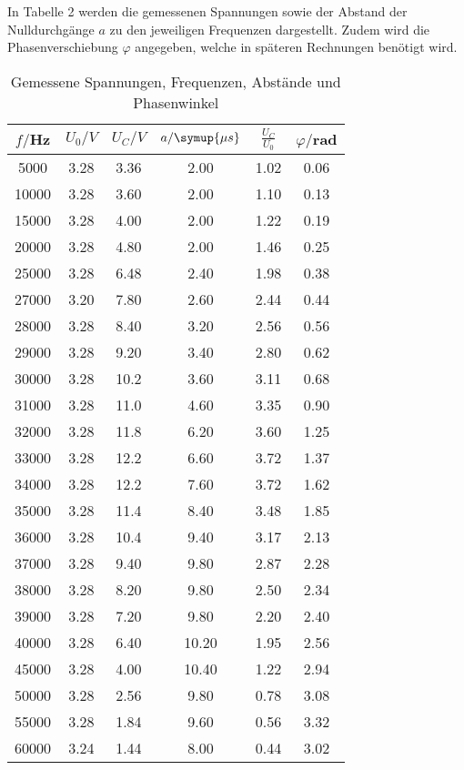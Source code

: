 In Tabelle 2 werden die gemessenen Spannungen sowie der Abstand der Nulldurchgänge $a$ zu den jeweiligen
Frequenzen dargestellt. Zudem wird die Phasenverschiebung $\varphi$ angegeben, welche in späteren Rechnungen
benötigt wird.

\begin{table}[H]
  \centering
  \caption{Gemessene Spannungen, Frequenzen, Abstände und Phasenwinkel}
  \label{tab:Spannungsamplitude}
  \begin{tabular}{c c c c c c}
    \toprule
    $f/$Hz & $U_0/V$ & $U_C/V$ & $a/\symup{\mu s}$ & $\frac{U_C}{U_0}$ & $\varphi/$rad   \\
    \midrule
    5000 & 3.28  &  3.36  &  2.00  &  1.02  &  0.06   \\
   10000 & 3.28  &  3.60  &  2.00  &  1.10  &  0.13   \\
   15000 & 3.28  &  4.00  &  2.00  &  1.22  &  0.19   \\
   20000 & 3.28  &  4.80  &  2.00  &  1.46  &  0.25   \\
   25000 & 3.28  &  6.48  &  2.40  &  1.98  &  0.38   \\
   27000 & 3.20  &  7.80  &  2.60  &  2.44  &  0.44   \\
   28000 & 3.28  &  8.40  &  3.20  &  2.56  &  0.56   \\
   29000 & 3.28  &  9.20  &  3.40  &  2.80  &  0.62   \\
   30000 & 3.28  &  10.2  &  3.60  &  3.11  &  0.68   \\
   31000 & 3.28  &  11.0  &  4.60  &  3.35  &  0.90   \\
   32000 & 3.28  &  11.8  &  6.20  &  3.60  &  1.25   \\
   33000 & 3.28  &  12.2  &  6.60  &  3.72  &  1.37   \\
   34000 & 3.28  &  12.2  &  7.60  &  3.72  &  1.62   \\
   35000 & 3.28  &  11.4  &  8.40  &  3.48  &  1.85   \\
   36000 & 3.28  &  10.4  &  9.40  &  3.17  &  2.13   \\
   37000 & 3.28  &  9.40  &  9.80  &  2.87  &  2.28   \\
   38000 & 3.28  &  8.20  &  9.80  &  2.50  &  2.34   \\
   39000 & 3.28  &  7.20  &  9.80  &  2.20  &  2.40   \\
   40000 & 3.28  &  6.40  &  10.20 &  1.95  &  2.56   \\
   45000 & 3.28  &  4.00  &  10.40 &  1.22  &  2.94   \\
   50000 & 3.28  &  2.56  &  9.80  &  0.78  &  3.08   \\
   55000 & 3.28  &  1.84  &  9.60  &  0.56  &  3.32   \\
   60000 & 3.24  &  1.44  &  8.00  &  0.44  &  3.02   \\
    \bottomrule
  \end{tabular}
\end{table}


